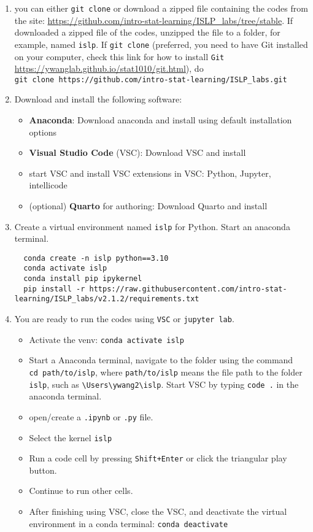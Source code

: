 \documentclass[
  letterpaper,
  DIV=11,
  numbers=noendperiod]{scrreprt}
\begin{document}
\begin{enumerate}
\def\labelenumi{\arabic{enumi}.}
\item
  you can either \texttt{git\ clone} or download a zipped file
  containing the codes from the site:
  \url{https://github.com/intro-stat-learning/ISLP_labs/tree/stable}. If
  downloaded a zipped file of the codes, unzipped the file to a folder,
  for example, named \texttt{islp}. If \texttt{git\ clone} (preferred,
  you need to have Git installed on your computer, check this link for
  how to install \texttt{Git}
  \url{https://ywanglab.github.io/stat1010/git.html}), do
  \texttt{git\ clone\ https://github.com/intro-stat-learning/ISLP\_labs.git}
\item
  Download and install the following software:

  \begin{itemize}
  \item
    \textbf{Anaconda}: Download anaconda and install using default
    installation options
  \item
    \textbf{Visual Studio Code} (VSC): Download VSC and install
  \item
    start VSC and install VSC extensions in VSC: Python, Jupyter,
    intellicode
  \item
    (optional) \textbf{Quarto} for authoring: Download Quarto and
    install
  \end{itemize}
\item
  Create a virtual environment named \texttt{islp} for Python. Start an
  anaconda terminal.

\begin{verbatim}
  conda create -n islp python==3.10
  conda activate islp
  conda install pip ipykernel
  pip install -r https://raw.githubusercontent.com/intro-stat-learning/ISLP_labs/v2.1.2/requirements.txt
\end{verbatim}
\item
  You are ready to run the codes using \texttt{VSC} or
  \texttt{jupyter\ lab}.

  \begin{itemize}
  \item
    Activate the venv: \texttt{conda\ activate\ islp}
  \item
    Start a Anaconda terminal, navigate to the folder using the command
    \texttt{cd\ path/to/islp}, where \texttt{path/to/islp} means the
    file path to the folder \texttt{islp}, such as
    \texttt{\textbackslash{}Users\textbackslash{}ywang2\textbackslash{}islp}.
    Start VSC by typing \texttt{code\ .} in the anaconda terminal.
  \item
    open/create a \texttt{.ipynb} or \texttt{.py} file.
  \item
    Select the kernel \texttt{islp}
  \item
    Run a code cell by pressing \texttt{Shift+Enter} or click the
    triangular play button.
  \item
    Continue to run other cells.
  \item
    After finishing using VSC, close the VSC, and deactivate the virtual
    environment in a conda terminal: \texttt{conda\ deactivate}
  \end{itemize}
\end{enumerate}
\end{document}
